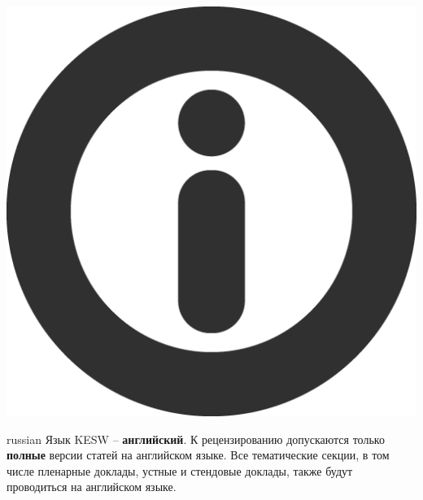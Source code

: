 \documentclass[a4paper, 10pt]{article}
\renewcommand{\skip}{\vspace{1ex}}
\begin{document}
\skip\skip

\begin{minipage}{.10\textwidth}
\includegraphics[width=\textwidth]{information}
\end{minipage}
\hfill
\begin{minipage}{.82\textwidth}
\begin{otherlanguage*}{russian}
\noindent Язык KESW -- \textbf{английский}. 
К рецензированию допускаются только \textbf{полные} версии статей на английском языке.
Все тематические секции, в том числе пленарные доклады, устные и стендовые доклады, также будут проводиться на английском языке.
\end{otherlanguage*}
\end{minipage}

\skip\skip
\end{document}
